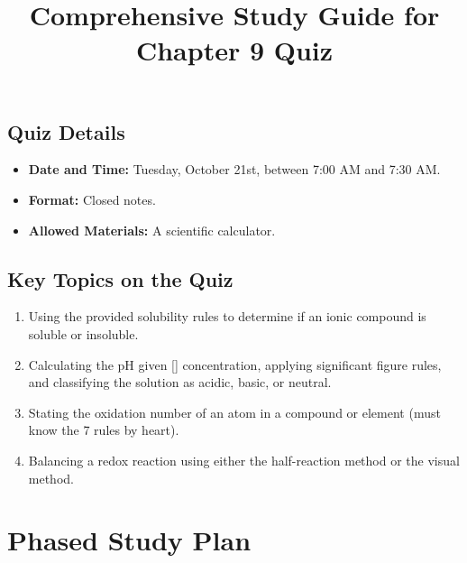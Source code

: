 \documentclass{article}
\title{Comprehensive Study Guide for Chapter 9 Quiz}
\author{}
\date{}
\begin{document}
\maketitle %

\hrulefill
\subsection*{Quiz Details}
\begin{itemize}[itemsep=5pt] %
    \item \textbf{Date and Time:} Tuesday, October 21st, between 7:00 AM and 7:30 AM.
    \item \textbf{Format:} Closed notes.
    \item \textbf{Allowed Materials:} A scientific calculator.
\end{itemize}

\hrulefill
\subsection*{Key Topics on the Quiz}
\begin{enumerate}[itemsep=5pt]
    \item Using the provided solubility rules to determine if an ionic compound is soluble or insoluble.
    \item Calculating the pH given [] concentration, applying significant figure rules, and classifying the solution as acidic, basic, or neutral.
    \item Stating the oxidation number of an atom in a compound or element (must know the 7 rules by heart).
    \item Balancing a redox reaction using either the half-reaction method or the visual method.
\end{enumerate}
\hrulefill
\bigskip %

\section*{Phased Study Plan}
\end{document}

